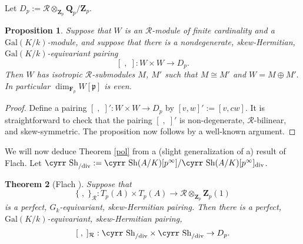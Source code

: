 \documentclass[reqno]{amsart}
\newtheorem{thm}{Theorem}[section]
\newtheorem{prop}[thm]{Proposition}
\theoremstyle{definition}
\def\Sh{\mbox{\cyrr Sh}}
\def\Z{\mathbf{Z}}
\def\Q{\mathbf{Q}}
\def\F{\mathbf{F}}
\def\Zp{\Z_p}
\def\Qp{\Q_p}
\def\Fp{\F_p}
\def\cR{\mathcal{R}}
\def\T{W}
\def\p{\mathfrak{p}}
\def\Gal{\mathrm{Gal}}
\def\div{\mathrm{div}}
\def\too{\longrightarrow}
\def\Shmd{\Sh_{/\div}}
\def\k{k}
\def\Dp{D_p}
\def\spair#1#2{[#1,#2]}
\def\bpair#1#2{\{#1,#2\}}
\begin{document}
Let $\Dp := \cR \otimes_{\Zp} \Qp/\Zp$.  

\begin{prop}
\label{linalg}
Suppose that $\T$ is an $\cR$-module of finite cardinality 
and a $\Gal(K/\k)$-module, 
and suppose that there is a nondegenerate, skew-Hermitian, 
$\Gal(K/\k)$-equivariant pairing 
$$
\spair{\;}{\;} : \T \times \T \too \Dp.
$$  
Then $\T$ has isotropic $\cR$-submodules $M$, $M'$ such that $M \cong M'$ and  
$
\T = M \oplus M'.
$
In particular $\dim_{\Fp}\T[\p]$ is even.
\end{prop}

\begin{proof}
Define a pairing $\spair{\;}{\;}' : \T \times \T \to \Dp$ by 
$\spair{v}{w}' := \spair{v}{c w}$.  It is straightforward to check 
that the pairing $\spair{\;}{\;}'$ is non-degenerate, $\cR$-bilinear, 
and skew-symmetric.  The proposition now follows by a well-known argument.
\end{proof}

We will now deduce Theorem \ref{pol} from a  
(slight generalization of a) result of Flach.
Let $\Shmd := \Sh(A/K)[p^\infty]/\Sh(A/K)[p^\infty]_\div$.  

\begin{thm}[Flach \cite{flach}]
\label{flachthm}
Suppose that 
$$
\bpair{\;}{\;}_\cR : T_p(A) \times T_p(A) \to \cR \otimes_{\Zp} \Zp(1)
$$ 
is a perfect, $G_{\k}$-equivariant, skew-Hermitian pairing.  
Then there is a perfect, $\Gal(K/\k)$-equivariant, skew-Hermitian pairing, 
$$
\spair{\;}{\;}_\cR : \Shmd \times \Shmd \to \Dp.
$$
\end{thm}
\end{document}
